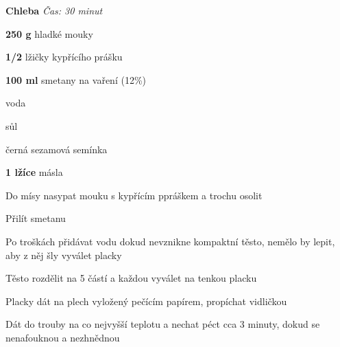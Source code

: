 \textbf{Chleba}
\emph{Čas: 30 minut}
\begin{ingredience}
  \item \textbf{250 g} hladké mouky
  \item \textbf{1/2} lžičky kypřícího prášku
  \item \textbf{100 ml} smetany na vaření (12\%)
  \item voda
  \item sůl
  \item černá sezamová semínka
  \item \textbf{1 lžíce} másla
\end{ingredience}
\begin{postup}
  \item Do mísy nasypat mouku s kypřícím ppráškem a trochu osolit
  \item Přilít smetanu
  \item Po troškách přidávat vodu dokud nevznikne kompaktní těsto, nemělo by lepit, aby z něj šly vyválet placky
  \item Těsto rozdělit na 5 částí a každou vyválet na tenkou placku
  \item Placky dát na plech vyložený pečícím papírem, propíchat vidličkou
  \item Dát do trouby na co nejvyšší teplotu a nechat péct cca 3 minuty, dokud se nenafouknou a nezhnědnou
\end{postup}
